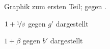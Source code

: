 \documentclass[11pt,a4paper]{article}
\begin{document}
\begin{figure}[p]
\centering
{}
\renewcommand\thefigure{1}
\caption{Graphik zum ersten Teil;  gegen .}
\label{Abb:1}
\end{figure}

\begin{figure}[b]
\centering
{}
\renewcommand\thefigure{2}
\caption[$1+\nicefrac{1}{\beta}$ gegen $g'$ dargestellt]{$1+\nicefrac{1}{\beta}$ gegen $g'$ dargestellt}
\label{Abb:g}
\end{figure}

\begin{figure}[b]
\centering
{}
\renewcommand\thefigure{3}
\caption[$1+{\beta}$ gegen $b'$ dargestellt]{$1+\beta$ gegen $b'$ dargestellt}
\label{Abb:b}
\end{figure}
\end{document}
